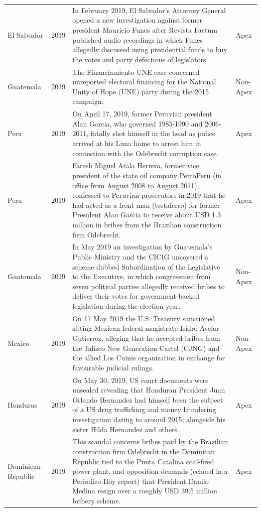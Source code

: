 \begin{landscape}
\begin{longtable}{@{}l c p{15.5cm} l@{}}
El Salvador & 2019 & In February 2019, El Salvador's Attorney General opened a new investigation against former president Mauricio Funes after Revista Factum published audio recordings in which Funes allegedly discussed using presidential funds to buy the votes and party defections of legislators. & Apex \\
Guatemala & 2019 & The Financiamiento UNE case concerned unreported electoral financing for the National Unity of Hope (UNE) party during the 2015 campaign. & Non-Apex \\
Peru & 2019 & On April 17, 2019, former Peruvian president Alan Garcia, who governed 1985-1990 and 2006-2011, fatally shot himself in the head as police arrived at his Lima home to arrest him in connection with the Odebrecht corruption case. & Apex \\
Peru & 2019 & Faresh Miguel Atala Herrera, former vice president of the state oil company PetroPeru (in office from August 2008 to August 2011), confessed to Peruvian prosecutors in 2019 that he had acted as a front man (testaferro) for former President Alan Garcia to receive about USD 1.3 million in bribes from the Brazilian construction firm Odebrecht. & Apex \\
Guatemala & 2019 & In May 2019 an investigation by Guatemala's Public Ministry and the CICIG uncovered a scheme dubbed Subordination of the Legislative to the Executive, in which congressmen from seven political parties allegedly received bribes to deliver their votes for government-backed legislation during the election year. & Non-Apex \\
Mexico & 2019 & On 17 May 2019 the U.S. Treasury sanctioned sitting Mexican federal magistrate Isidro Avelar Gutierrez, alleging that he accepted bribes from the Jalisco New Generation Cartel (CJNG) and the allied Los Cuinis organization in exchange for favourable judicial rulings. & Non-Apex \\
Honduras & 2019 & On May 30, 2019, US court documents were unsealed revealing that Honduran President Juan Orlando Hernandez had himself been the subject of a US drug trafficking and money laundering investigation dating to around 2015, alongside his sister Hilda Hernandez and others. & Apex \\
Dominican Republic & 2019 & This scandal concerns bribes paid by the Brazilian construction firm Odebrecht in the Dominican Republic tied to the Punta Catalina coal-fired power plant, and opposition demands (echoed in a Periodico Hoy report) that President Danilo Medina resign over a roughly USD 39.5 million bribery scheme. & Apex \\

\end{longtable}
\end{landscape}
